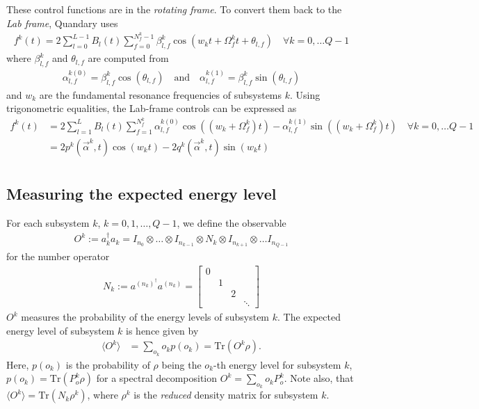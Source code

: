 \documentclass[letterpaper]{article}
\begin{document}
These control functions are in the \textit{rotating frame}. To convert them back
to the \textit{Lab frame}, Quandary uses
\begin{align}
  f^k(t) = 2 \sum_{l=0}^{L-1} B_l(t) \sum_{f=0}^{N_f^k-1} \beta_{l,f}^k \cos(w_k t +
  \Omega_f^k t + \theta_{l,f}) \quad \forall k=0,\dots Q-1
\end{align}
where $\beta_{l,f}^k$ and $\theta_{l,f}$ are computed from
\begin{align}
  \alpha_{l,f}^{k(0)} = \beta_{l,f}^k \cos(\theta_{l,f}) \quad \text{and} \quad
  \alpha_{l,f}^{k(1)} = \beta_{l,f}^k \sin(\theta_{l,f})
\end{align}
and $w_k$ are the fundamental resonance frequencies of subsystems $k$. Using
trigonometric equalities, the Lab-frame controls can be expressed as
\begin{align}
  f^k(t) &= 2 \sum_{l=1}^L B_l(t) \sum_{f=1}^{N_f^k} \alpha_{l,f}^{k(0)} \cos((w_k
  + \Omega_f^k) t) - \alpha_{l,f}^{k(1)}\sin((w_k + \Omega_f^k) t) \quad \forall
  k=0,\dots Q-1 \\
         &= 2 p^k(\vec{\alpha}^k, t) \cos(w_k t) - 2 q^k(\vec{\alpha}^k,
         t)\sin(w_k t) \\
\end{align}

\subsection{Measuring the expected energy level}\label{sec:expectedenergy}
For each subsystem $k$, $k=0,1,\dots, Q-1$, we define the observable 
\begin{align}
  O^k := a_k^\dag a_k  = I_{n_0} \otimes \dots \otimes I_{n_{k-1}} \otimes  N_k
  \otimes I_{n_{k+1}} \otimes \dots I_{n_{Q-1}} 
\end{align}
for the number operator 
\begin{align}
  N_k := a^{(n_k)^\dag} a^{(n_k)} = \begin{bmatrix} 
   0 &    &    & \\
     &  1 &    &\\
     &    &  2 &\\
     &    &    & \ddots 
  \end{bmatrix}
\end{align}
$O^k$ measures the probability of the energy levels of subsystem $k$. The
expected energy level of subsystem $k$ is hence given by 
\begin{align}
  \langle O^k \rangle &= \sum_{o_k} o_k p(o_k)  = \mbox{Tr}(O^k\rho).
  \label{eq:expected_energy1}
\end{align}
Here, $p(o_k)$ is the probability of $\rho$ being the $o_k$-th energy level for
subsystem $k$, $p(o_k) = \mbox{Tr}(P^k_o \rho)$ for a spectral decomposition
$O^k = \sum_{o_k} o_kP^k_o$. Note also, that $\langle O^k \rangle = \mbox{Tr}(N_k \rho^k)$,
where $\rho^k$ is the \textit{reduced} density matrix for subsystem $k$. 
\end{document}
